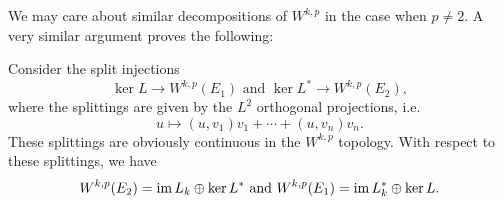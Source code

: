 \documentclass{amsart}
\begin{document}
 We may care about similar decompositions of $W^{k,p}$ in the case
 when $p\ne 2$. A very similar argument proves the following:
 \begin{thm}
   Consider the split injections
   \begin{equation*}
     \ker L\to W^{k,p}(E_{1})\text{ and }\ker L^{*}\to W^{k,p}(E_{2}),
   \end{equation*}
   where the splittings are given by the $L^{2}$ orthogonal
   projections, i.e.
   \begin{equation*}
     u\mapsto (u,v_{1})v_{1}+\cdots+(u,v_{n})v_{n}.
   \end{equation*}
   These splittings are obviously continuous in the $W^{k,p}$
   topology. With respect to these splittings, we have
   \begin{equation*}
     W^{k,p}(E_{2})=\operatorname{\mathrm{im}} L_{k}\oplus \ker L^{*}\text{ and }W^{k,p}(E_{1})=\operatorname{\mathrm{im}} L_{k}^{*}\oplus \ker L.
   \end{equation*}
 \end{thm}
\end{document}
